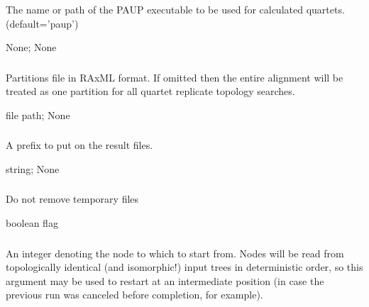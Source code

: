 \documentclass[letterpaper,12pt,english]{sphinxmanual}
\begin{document}
\subsubsection{}
\label{\detokenize{prog_desc:paup-executable}}
 The name or path of the PAUP executable to be used for calculated quartets. (default=’paup’)

 None;  None


\subsubsection{}
\label{\detokenize{prog_desc:q-partitions}}
 Partitions file in RAxML format. If omitted then the entire alignment will be treated as one partition for all quartet replicate topology searches.

 file path;  None


\subsubsection{}
\label{\detokenize{prog_desc:r-result-prefix}}
 A prefix to put on the result files.

 string;  None


\subsubsection{}
\label{\detokenize{prog_desc:retain-temp}}
 Do not remove temporary files

 boolean flag


\subsubsection{}
\label{\detokenize{prog_desc:s-start-node-number}}
 An integer denoting the node to which to start from. Nodes will be read from topologically identical (and isomorphic!) input trees in deterministic order, so this argument may be  used to restart at an intermediate position (in case the previous run was canceled before completion, for example).
\end{document}
